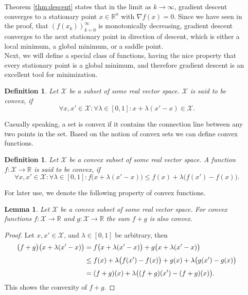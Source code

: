 \documentclass[11pt, a4paper]{article}
\newtheorem{lemma}[theorem]{Lemma}
\newtheorem{definition}[theorem]{Definition}
\newcommand{\R}{\mathbb{R}}
\newcommand{\X}{\mathcal{X}}
\begin{document}
Theorem \ref{thm:descent} states that in the limit as $k \to \infty$, gradient descent converges to a stationary point $x \in \R^n$ with $\nabla f(x) = 0$. Since we have seen in the proof, that $(f(x_k))_{k=0}^{\infty}$ is monotonically decreasing, gradient descent converges to the next stationary point in direction of descent, which is either a local minimum, a global minimum, or a saddle point. \\

Next, we will define a special class of functions, having the nice property that every stationary point is a global minimum, and therefore gradient descent is an excellent tool for minimization.

\begin{definition}
Let $\X$ be a subset of some real vector space. $\X$ is said to be convex, if 
\[ \forall x, x' \in \X : \forall \lambda \in [0,1] : x + \lambda (x' - x) \in \X. \]
\end{definition}

Casually speaking, a set is convex if it contains the connection line between any two points in the set. Based on the notion of convex sets we can define convex functions.

\begin{definition}
Let $\X$ be a convex subset of some real vector space. A function $f: \X \to \R$ is said to be convex, if
\[ \forall x,x' \in \X : \forall \lambda \in [0,1] : f \big (x + \lambda (x'-x) \big ) \leq f(x) + \lambda \big ( f(x') - f(x) \big ). \]
\end{definition}

For later use, we denote the following property of convex functions.

\begin{lemma} \label{lem:convexity}
Let $\X$ be a convex subset of some real vector space. For convex functions $f: \X \to \R$ and $g: \X \to \R$ the sum $f+g$ is also convex.
\end{lemma}

\begin{proof}
Let $x,x' \in \X$, and $\lambda \in [0,1]$ be arbitrary, then
\[ \begin{split}
\big ( f+g \big ) \big (x + \lambda (x'-x) \big ) 
&= f \big ( x + \lambda (x'-x) \big ) + g \big (x + \lambda (x'-x) \big ) \\\
\textcolor{white}{\Big |} &\leq f(x) + \lambda \big ( f(x') - f(x) \big ) + g(x) + \lambda \big ( g(x') - g(x) \big ) \\\
&= ( f + g )(x) + \lambda \big ( (f + g)(x') - (f+g)(x) \big ).
\end{split} \]
This shows the convexity of $f+g$.
\end{proof}
\end{document}
